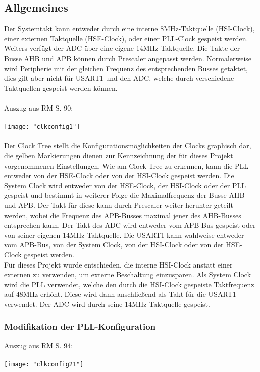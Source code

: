 \documentclass[11pt]{report}
\begin{document}
		\subsection{Allgemeines}
			 Der Systemtakt kann entweder durch eine interne 8MHz-Taktquelle (HSI-Clock), einer externen Taktquelle (HSE-Clock), oder einer PLL-Clock gespeist werden. Weiters verfügt der ADC über eine eigene 14MHz-Taktquelle. Die Takte der Busse AHB und APB können durch Prescaler angepasst werden. Normalerweise wird Peripherie mit der gleichen Frequenz des entsprechenden Busses getaktet, dies gilt aber nicht für USART1 und den ADC, welche durch verschiedene Taktquellen gespeist werden können.\\
			\\Auszug aus RM S. 90:\\
			\\\texttt{[image: "clkconfig1"]}\\
			\\Der Clock Tree stellt die Konfigurationsmöglichkeiten der Clocks graphisch dar, die gelben Markierungen dienen zur Kennzeichnung der für dieses Projekt vorgenommenen Einstellungen. Wie am Clock Tree zu erkennen, kann die PLL entweder von der HSE-Clock oder von der HSI-Clock gespeist werden. Die System Clock wird entweder von der HSE-Clock, der HSI-Clock oder der PLL gespeist und bestimmt in weiterer Folge die Maximalfrequenz der Busse AHB und APB. Der Takt für diese kann durch Prescaler weiter herunter geteilt werden, wobei die Frequenz des APB-Busses maximal jener des AHB-Busses entsprechen kann. Der Takt des ADC wird entweder vom APB-Bus gespeist oder von seiner eigenen 14MHz-Taktquelle. Die USART1 kann wahlweise entweder vom APB-Bus, von der System Clock, von der HSI-Clock oder von der HSE-Clock gespeist werden.\\
			Für dieses Projekt wurde entschieden, die interne HSI-Clock anstatt einer externen zu verwenden, um externe Beschaltung einzusparen. Als System Clock wird die PLL verwendet, welche den durch die HSI-Clock gespeiste Taktfrequenz auf 48MHz erhöht. Diese wird dann anschließend als Takt für die USART1 verwendet. Der ADC wird durch seine 14MHz-Taktquelle gespeist.
			\subsubsection{Modifikation der PLL-Konfiguration}
			Auszug aus RM S. 94:\\
			\\\texttt{[image: "clkconfig21"]}\\
\end{document}
